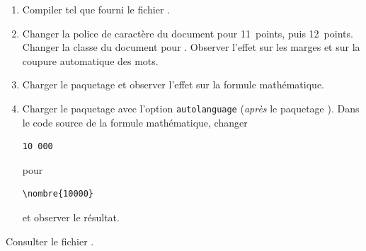 \begin{exercice}
  \begin{enumerate}
  \item Compiler tel que fourni le fichier
    .
  \item Changer la police de caractère du document pour 11~points,
    puis 12~points. Changer la classe du document pour .
    Observer l'effet sur les marges et sur la coupure automatique des
    mots.
  \item Charger le paquetage  et observer l'effet sur la
    formule mathématique.
  \item Charger le paquetage  avec l'option
    \verb=autolanguage= (\emph{après} le paquetage ). Dans
    le code source de la formule mathématique, changer
\begin{lstlisting}
10 000
\end{lstlisting}
    pour
\begin{lstlisting}
\nombre{10000}
\end{lstlisting}
    et observer le résultat.
  \end{enumerate}
  \begin{sol}
    Consulter le fichier .
  \end{sol}
\end{exercice}


